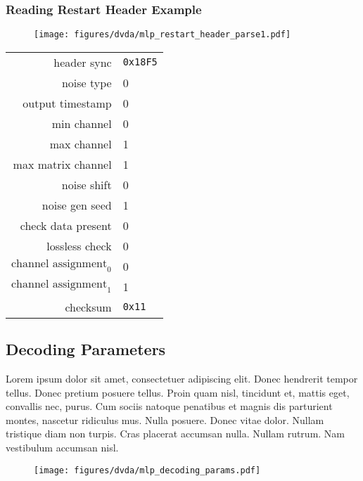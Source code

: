 \clearpage

\subsubsection{Reading Restart Header Example}

\begin{figure}[h]
  \texttt{[image: figures/dvda/mlp\_restart\_header\_parse1.pdf]}
\end{figure}
\begin{table}[h]
{
  \begin{tabular}{rl}
    header sync & \texttt{0x18F5} \\
    noise type & 0 \\
    output timestamp & 0 \\
    min channel & 0 \\
    max channel & 1 \\
    max matrix channel & 1 \\
    noise shift & 0 \\
    noise gen seed & 1 \\
    check data present & 0 \\
    lossless check & 0 \\
    $\text{channel assignment}_0$ & 0 \\
    $\text{channel assignment}_1$ & 1 \\
    checksum & \texttt{0x11} \\
  \end{tabular}
}
\end{table}

\clearpage

\subsection{Decoding Parameters}


Lorem ipsum dolor sit amet, consectetuer adipiscing elit. Donec hendrerit tempor tellus. Donec pretium posuere tellus. Proin quam nisl, tincidunt et, mattis eget, convallis nec, purus. Cum sociis natoque penatibus et magnis dis parturient montes, nascetur ridiculus mus. Nulla posuere. Donec vitae dolor. Nullam tristique diam non turpis. Cras placerat accumsan nulla. Nullam rutrum. Nam vestibulum accumsan nisl.

\clearpage

\begin{figure}[h]
  \texttt{[image: figures/dvda/mlp\_decoding\_params.pdf]}
\end{figure}

